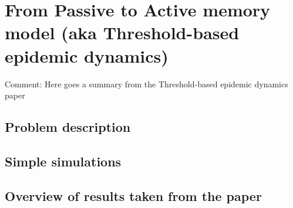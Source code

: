 \section{From Passive to Active memory model (aka Threshold-based epidemic dynamics)}
Comment: Here goes a summary from the Threshold-based epidemic dynamics paper
\subsection{Problem description}
\subsection{Simple simulations}
\subsection{Overview of results taken from the paper}

